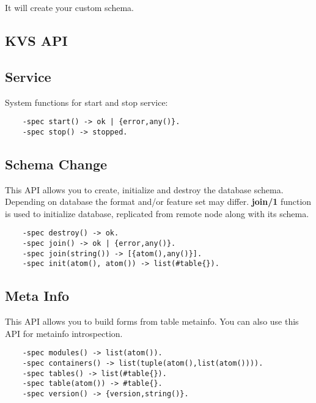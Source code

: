 It will create your custom schema.

\subsection{KVS API}

\subsection{Service}
System functions for start and stop service:

\vspace{1\baselineskip}
\begin{lstlisting}
    -spec start() -> ok | {error,any()}.
    -spec stop() -> stopped.
\end{lstlisting}
\vspace{1\baselineskip}

\subsection{Schema Change}
This API allows you to create, initialize and destroy the database schema.
Depending on database the format and/or feature set may differ. {\bf join/1} function
is used to initialize database, replicated from remote node along with its schema.

\vspace{1\baselineskip}
\begin{lstlisting}
    -spec destroy() -> ok.
    -spec join() -> ok | {error,any()}.
    -spec join(string()) -> [{atom(),any()}].
    -spec init(atom(), atom()) -> list(#table{}).
\end{lstlisting}
\vspace{1\baselineskip}

\subsection{Meta Info}
This API allows you to build forms from table metainfo.
You can also use this API for metainfo introspection.

\vspace{1\baselineskip}
\begin{lstlisting}
    -spec modules() -> list(atom()).
    -spec containers() -> list(tuple(atom(),list(atom()))).
    -spec tables() -> list(#table{}).
    -spec table(atom()) -> #table{}.
    -spec version() -> {version,string()}.
\end{lstlisting}
\vspace{1\baselineskip}

